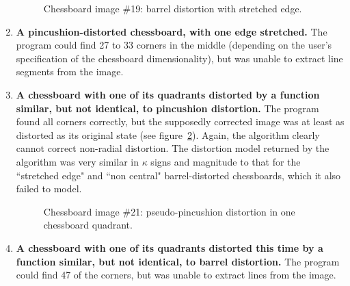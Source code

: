 \begin{enumerate}
\begin{figure}[h]
  \caption{Chessboard image \#19: barrel distortion with stretched edge.}
  \label{fig:chess-19}
\end{figure}
  \item \textbf{A pincushion-distorted chessboard, with one edge stretched.} The program could find 27 to 33 corners in the middle (depending on the user's specification of the chessboard dimensionality), but was unable to extract line segments from the image.
  \item \textbf{A chessboard with one of its quadrants distorted by a function similar, but not identical, to pincushion distortion.} The program found all corners correctly, but the supposedly corrected image was at least as distorted as its original state (see figure~\ref{fig:chess-21}). Again, the algorithm clearly cannot correct non-radial distortion. The distortion model returned by the algorithm was very similar in $\kappa$ signs and magnitude to that for the ``stretched edge" and ``non central" barrel-distorted chessboards, which it also failed to model.
\begin{figure}[h]
  \centering
  \caption{Chessboard image \#21: pseudo-pincushion distortion in one chessboard quadrant.}
  \label{fig:chess-21}
\end{figure}
  \item \textbf{A chessboard with one of its quadrants distorted this time by a function similar, but not identical, to barrel distortion.} The program could find 47 of the corners, but was unable to extract lines from the image.
\end{enumerate}

